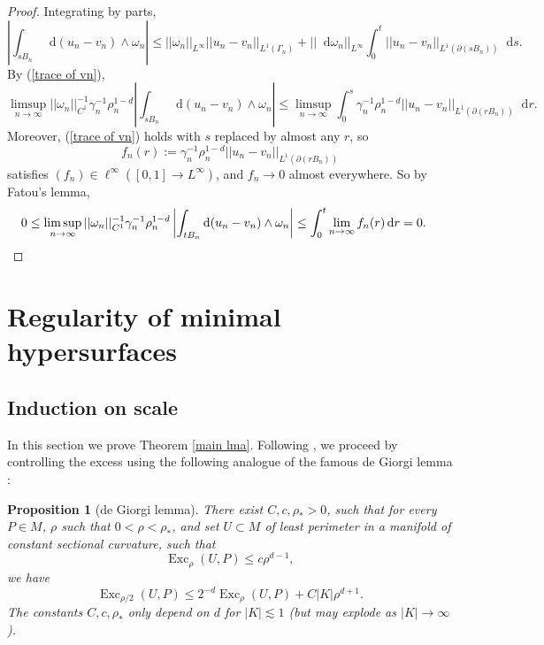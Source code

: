 \documentclass[reqno,10pt]{amsart}
\DeclareMathOperator{\Exc}{Exc}
\newcommand*\dif{\mathop{}\!\mathrm{d}}
\newtheorem{proposition}[theorem]{Proposition}
\theoremstyle{definition}
\numberwithin{equation}{section}
\begin{document}
\begin{proof}
Integrating by parts,
$$\left|\int_{sB_n} \dif (u_n - v_n) \wedge \omega_n\right| \leq ||\omega_n||_{L^\infty} ||u_n - v_n||_{L^1(\Gamma_n)} + ||\dif \omega_n||_{L^\infty} \int_0^t ||u_n - v_n||_{L^1(\partial(sB_n))} \dif s.$$
By (\ref{trace of vn}),
$$\limsup_{n \to \infty} ||\omega_n||_{C^1}^{-1} \gamma_n^{-1} \rho_n^{1 - d} \left|\int_{sB_n} \dif(u_n - v_n) \wedge \omega_n\right| \leq \limsup_{n \to \infty} \int_0^s \gamma_n^{-1} \rho_n^{1 - d} ||u_n - v_n||_{L^1(\partial(rB_n))} \dif r.$$
Moreover, (\ref{trace of vn}) holds with $s$ replaced by almost any $r$, so
$$f_n(r) := \gamma_n^{-1} \rho_n^{1 - d} ||u_n - v_n||_{L^1(\partial(rB_n))}$$
satisfies $(f_n) \in \ell^\infty([0, 1] \to L^\infty)$, and $f_n \to 0$ almost everywhere.
So by Fatou's lemma,
\begin{align*}
0 \leq \limsup_{n \to \infty} ||\omega_n||_{C^1}^{-1} \gamma_n^{-1} \rho_n^{1 - d} \left|\int_{tB_n} \dif(u_n - v_n) \wedge \omega_n\right| &\leq \int_0^t \lim_{n \to \infty} f_n(r) \dif r = 0. \qedhere
\end{align*}
\end{proof}


\section{Regularity of minimal hypersurfaces}\label{Plateau section}
\subsection{Induction on scale}
In this section we prove Theorem \ref{main lma}.
Following \cite{Miranda66,Giusti77,deGiorgi61}, we proceed by controlling the excess using the following analogue of the famous de Giorgi lemma \cite[Theorem 8.1]{Giusti77}:

\begin{proposition}[de Giorgi lemma]\label{de Giorgi}
There exist $C, c, \rho_* > 0$, such that for every $P \in M$, $\rho$ such that $0 < \rho < \rho_*$, and set $U \subset M$ of least perimeter in a manifold of constant sectional curvature, such that 
\begin{equation}\label{base case}
\Exc_\rho(U, P) \leq c\rho^{d - 1},
\end{equation}
we have 
\begin{equation}\label{dGL concl}
\Exc_{\rho/2}(U, P) \leq 2^{-d} \Exc_\rho(U, P) + C|K|\rho^{d + 1}.
\end{equation}
The constants $C, c, \rho_*$ only depend on $d$ for $|K| \lesssim 1$ (but may explode as $|K| \to \infty$).
\end{proposition}
\end{document}
